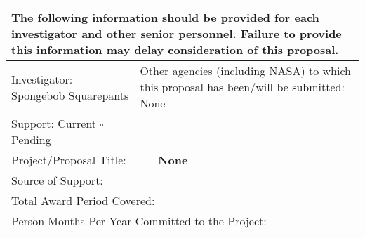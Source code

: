 \documentclass[12pt]{article}
\begin{document}
\renewcommand{\arraystretch}{1.2}
\footnotesize
\begin{tabularx}{0.5\textwidth}{|p{5cm}p{4cm}p{4cm}X|} \hline

\multicolumn{4}{|p{\dimexpr\textwidth-2\tabcolsep-0.8pt}|}{The following information should be provided for each investigator and other senior personnel. Failure to provide this information may delay consideration of this proposal.} \\

\hline

\multicolumn{2}{|l|}{Investigator: Spongebob Squarepants} & \multicolumn{2}{p{\dimexpr\textwidth-6\tabcolsep-1.2pt-9cm}|}{Other agencies (including NASA) to which this proposal has been/will be submitted: None} \\

\hline

Support: \rlap{$\square$}\raisebox{2pt}{\large\hspace{1pt}\ding{51}} Current $\square$ Pending & {} & {} & {} \\ 

\multicolumn{4}{|p{\dimexpr\textwidth-2\tabcolsep-0.8pt}|}{Project/Proposal Title: \ \ \ \ \ \textbf{None}}\\

\multicolumn{4}{|p{\dimexpr\textwidth-2\tabcolsep-0.8pt}|}{Source of Support:}\\

\multicolumn{4}{|p{\dimexpr\textwidth-2\tabcolsep-0.8pt}|}{Total Award Period Covered:}\\

\multicolumn{4}{|p{\dimexpr\textwidth-2\tabcolsep-0.8pt}|}{Person-Months Per Year Committed to the Project:}\\

\hline


\end{tabularx}

\normalsize
\end{document}
